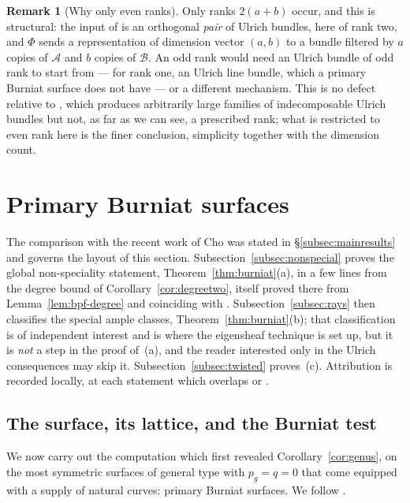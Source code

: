 \documentclass{amsart}
\theoremstyle{definition}
\newtheorem{remark}[theorem]{Remark}
\begin{document}
\begin{remark}[Why only even ranks]\label{rem:evenonly}
Only ranks $2(a+b)$ occur, and this is structural: the input of \cite[Thm.~A]{FPL} is an orthogonal \emph{pair} of Ulrich bundles, here of rank two, and $\Phi$ sends a representation of dimension vector $(a,b)$ to a bundle filtered by $a$ copies of $\mathcal A$ and $b$ copies of $\mathcal B$. An odd rank would need an Ulrich bundle of odd rank to start from --- for rank one, an Ulrich line bundle, which a primary Burniat surface does not have \cite{Cho26} --- or a different mechanism. This is no defect relative to \cite[Thm.~1.3]{Cas17}, which produces arbitrarily large families of indecomposable Ulrich bundles but not, as far as we can see, a prescribed rank; what is restricted to even rank here is the finer conclusion, simplicity together with the dimension count.
\end{remark}

\section{Primary Burniat surfaces}\label{sec:burniat}

The comparison with the recent work of Cho \cite{Cho26} was stated in \S\ref{subsec:mainresults} and governs the layout of this section. Subsection~\ref{subsec:nonspecial} proves the global non-speciality statement, Theorem~\ref{thm:burniat}(a), in a few lines from the degree bound of Corollary~\ref{cor:degreetwo}, itself proved there from Lemma~\ref{lem:bpf-degree} and coinciding with \cite[Prop.~5.4]{Cho26}. Subsection~\ref{subsec:rays} then classifies the special ample classes, Theorem~\ref{thm:burniat}(b); that classification is of independent interest and is where the eigensheaf technique is set up, but it is \emph{not} a step in the proof of~(a), and the reader interested only in the Ulrich consequences may skip it. Subsection~\ref{subsec:twisted} proves~(c). Attribution is recorded locally, at each statement which overlaps \cite{Cho26} or \cite{Ale16}.

\subsection{The surface, its lattice, and the Burniat test}\label{subsec:burniat}
We now carry out the computation which first revealed Corollary~\ref{cor:genus}, on the most symmetric surfaces of general type with $p_g=q=0$ that come equipped with a supply of natural curves: primary Burniat surfaces. We follow \cite{BC11,Pet77}.
\end{document}
